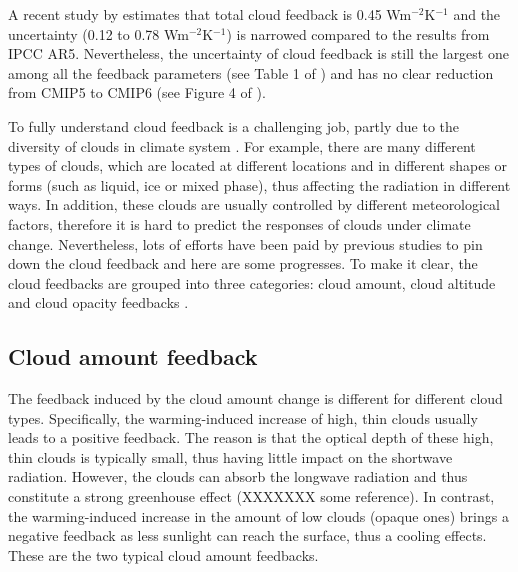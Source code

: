 
A recent study by \cite{Sherwood2020} estimates that total cloud feedback is 0.45 Wm$^{-2}$K$^{-1}$ and the uncertainty (0.12 to 0.78 Wm$^{-2}$K$^{-1}$) is narrowed compared to the results from IPCC AR5. Nevertheless, the uncertainty of cloud feedback is still the largest one among all the feedback parameters (see Table 1 of \citealt{Sherwood2020}) and has no clear reduction from CMIP5 to CMIP6 (see Figure 4 of \citealt{Sherwood2020}).

To fully understand cloud feedback is a challenging job, partly due to the diversity of clouds in climate system \citep{Zelinka2017}. For example, there are many different types of clouds, which are located at different locations and in different shapes or forms (such as liquid, ice or mixed phase), thus affecting the radiation in different ways. In addition, these clouds are usually controlled by different meteorological factors, therefore it is hard to predict the responses of clouds under climate change. Nevertheless, lots of efforts have been paid by previous studies to pin down the cloud feedback and here are some progresses. To make it clear, the cloud feedbacks are grouped into three categories: cloud amount, cloud altitude and cloud opacity feedbacks \citep{Zelinka2017}.


\subsection{Cloud amount feedback}
The feedback induced by the cloud amount change is different for different cloud types. Specifically, the warming-induced increase of high, thin clouds usually leads to a positive feedback. The reason is that the optical depth of these high, thin clouds is typically small, thus having little impact on the shortwave radiation. However, the clouds can absorb the longwave radiation and thus constitute a strong greenhouse effect (XXXXXXX some reference). In contrast, the warming-induced increase in the amount of low clouds (opaque ones) brings a negative feedback as less sunlight can reach the surface, thus a cooling effects. These are the two typical cloud amount feedbacks.

